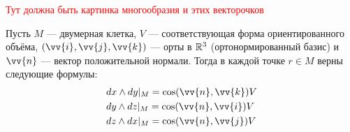 \textcolor{red}{Тут должна быть картинка многообразия и этих векторочков}

\begin{proposition}
	Пусть $M$ --- двумерная клетка, $V$ --- соответствующая форма ориентированного объёма, $(\vv{i}, \vv{j}, \vv{k})$ --- орты в $\mathbb{R}^3$ (ортонормированный базис) и $\vv{n}$ --- вектор положительной нормали. Тогда в каждой точке $r \in M$ верны следующие формулы:
	\begin{align*}
		&{dx \wedge dy|_M = \cos(\vv{n}, \vv{k})V}
		\\
		&{dy \wedge dz|_M = \cos(\vv{n}, \vv{i})V}
		\\
		&{dz \wedge dx|_M = \cos(\vv{n}, \vv{j})V}
	\end{align*}
\end{proposition}

